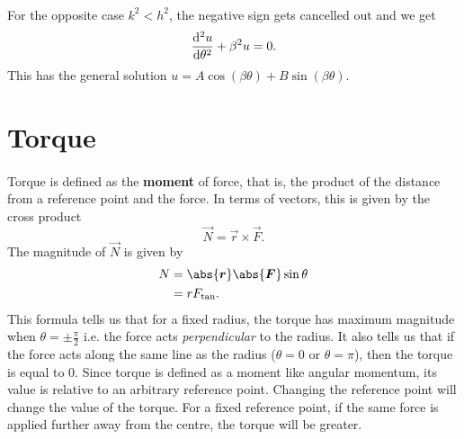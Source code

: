 \documentclass[../classical_mechanics.tex]{subfiles}
\begin{document}
\begin{example}
            \paragraph{}
            For the opposite case $k^2<h^2$, the negative sign gets cancelled out and we get
            \begin{equation}
                \dv[2]{u}{\theta}+\beta^2 u=0.
            \end{equation}
            This has the general solution $u=A\cos(\beta\theta)+B\sin(\beta\theta)$.

        \end{example}

    \section{Torque}
        \paragraph{}
        Torque is defined as the \textbf{moment} of force, that is, the product of the distance from a reference point and the force.
        In terms of vectors, this is given by the cross product
        \begin{equation}
            \vec{N}=\vec{r}\times\vec{F}.
        \end{equation}
        The magnitude of $\vec{N}$ is given by
        \begin{align}
            N&=\abs{\vec{r}}\abs{\vec{F}}\sin\theta\\
            &=rF_\text{tan}.
        \end{align}
        This formula tells us that for a fixed radius, the torque has maximum magnitude when $\theta=\pm\frac{\pi}{2}$ i.e. the force acts \textit{perpendicular} to the radius.
        It also tells us that if the force acts along the same line as the radius ($\theta=0$ or $\theta=\pi$), then the torque is equal to 0.
        Since torque is defined as a moment like angular momentum, its value is relative to an arbitrary reference point.
        Changing the reference point will change the value of the torque.
        For a fixed reference point, if the same force is applied further away from the centre, the torque will be greater.
        
\end{document}

